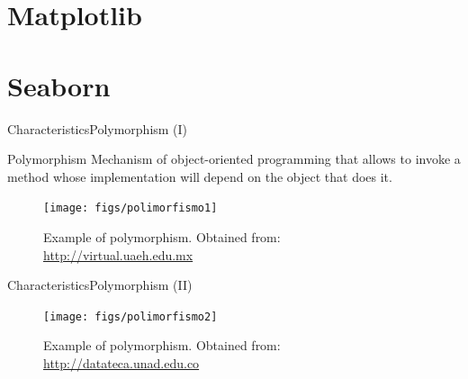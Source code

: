 \documentclass[10pt,compress]{beamer} %
\begin{document}
\section{Matplotlib}
\section{Seaborn}


\begin{frame}{Characteristics}{Polymorphism (I)}
\vspace{-0.2cm}
	\begin{block}{Polymorphism}
		Mechanism of object-oriented programming that allows to invoke a method whose implementation will depend on the object that does it.
  	\end{block}	
	\begin{figure}
	  \vspace{-0.2cm}
		\texttt{[image: figs/polimorfismo1]}
		\vspace{-0.2cm}
		\caption{\scriptsize{Example of polymorphism. Obtained from: \url{http://virtual.uaeh.edu.mx}}}
	\end{figure}
\end{frame}

\begin{frame}{Characteristics}{Polymorphism (II)}
	\begin{figure}
		\texttt{[image: figs/polimorfismo2]}
		\vspace{-0.1cm}
		\caption{{\scriptsize Example of polymorphism. Obtained from: \url{http://datateca.unad.edu.co}}}
	\end{figure}
\end{frame}
\end{document}
